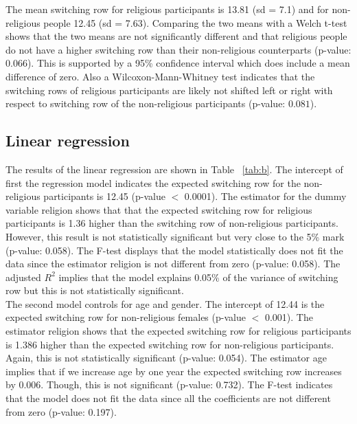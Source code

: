\documentclass[10pt,a4paper]{article}
\begin{document}


The mean switching row for religious participants is 13.81 (sd = 7.1) and for non-religious people 12.45 (sd = 7.63). Comparing the two means with a Welch t-test shows that the two means are not significantly different and that religious people do not have a higher switching row than their non-religious counterparts (p-value: $0.066$). This is supported by a 95\% confidence interval which does include a mean difference of zero. Also a Wilcoxon-Mann-Whitney test indicates that the switching rows of religious participants are likely not shifted left or right with respect to switching row of the non-religious participants (p-value: $0.081$).\\ 

\subsection{Linear regression}
The results of the linear regression are shown in Table ~\ref{tab:b}. The intercept of first the regression model indicates the expected switching row for the non-religious participants is 12.45 (p-value $<$ 0.0001). The estimator for the dummy variable religion shows that that the expected switching row for religious participants is 1.36 higher than the switching row of non-religious participants. However, this result is not statistically significant but very close to the 5\% mark (p-value: 0.058). The F-test displays that the model statistically does not fit the data since the estimator religion is not different from zero (p-value: 0.058). The adjusted $R^2$ implies that the model explains 0.05\% of the variance of switching row but this is not statistically significant.\\


The second model controls for age and gender. The intercept of 12.44 is the expected switching row for non-religious females (p-value $<$ 0.001). The estimator religion shows that the expected switching row for religious participants is 1.386 higher than the expected switching row for non-religious participants. Again, this is not statistically significant (p-value: 0.054). The estimator age implies that if we increase age by one year the expected switching row increases by 0.006. Though, this is not significant (p-value: 0.732). The F-test indicates that the model does not fit the data since all the coefficients are not different from zero (p-value: 0.197).\\
\end{document}
